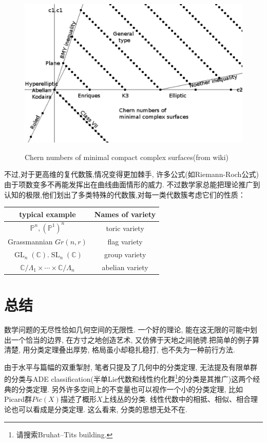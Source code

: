 \documentclass[UTF8,12pt,twoside]{article}
\theoremstyle{definition}
\newcommand{\CC}{\mathbb{C}}  %
\newcommand{\GL}{\operatorname{GL}}
\newcommand{\SL}{\operatorname{SL}}
\numberwithin{equation}{section}
\begin{document}
\begin{center}
	\begin{figure}[ht]
		\vspace{0cm}
		\centering
		\includegraphics[width=14cm]{9-7-fig/chernofsurfaces.png}
		\label{fig:chernnumber}
		\captionsetup{labelformat=empty}
		\caption{Chern numbers of minimal compact complex surfaces(from wiki)}
	\end{figure}
\end{center}

不过,对于更高维的复代数簇,情况变得更加棘手, 许多公式(如Riemann-Roch公式)由于项数变多不再能发挥出在曲线曲面情形的威力. 不过数学家总能把理论推广到认知的极限,他们划出了多类特殊的代数簇,对每一类代数簇考虑它们的性质：
\begin{center}
	\begin{tabular}{|c|c|}
		\hline
		typical example & Names of variety\\
		\hline
		$\mathbb{P}^n,(\mathbb{P}^1)^n$ & toric variety \\
		\hline
		Grassmannian $Gr(n,r)$ & flag variety\\
		\hline
		$\GL_n(\CC).\SL_n(\CC)$ & group variety\\
		\hline
		$\CC/\Lambda_1 \times\cdots\times \CC/\Lambda_n$ & abelian variety\\
		\hline
	\end{tabular}
\end{center}



\section{总结}


数学问题的无尽性恰如几何空间的无限性. 一个好的理论, 能在这无限的可能中划出一个恰当的边界, 在方寸之地创造艺术, 又仿佛于天地之间驰骋.把简单的例子算清楚, 用分类定理叠出厚势, 格局虽小却稳扎稳打, 也不失为一种前行方法.

由于水平与篇幅的双重掣肘, 笔者只提及了几何中的分类定理, 无法提及有限单群的分类与ADE classification(半单Lie代数和线性约化群\footnote{请搜索Bruhat--Tits building.}的分类是其推广)这两个经典的分类定理. 另外许多空间上的不变量也可以视作一个小的分类定理, 比如Picard群$Pic(X)$描述了概形$X$上线丛的分类. 线性代数中的相抵、相似、相合理论也可以看成是分类定理. 这么看来, 分类的思想无处不在.

\end{document}
